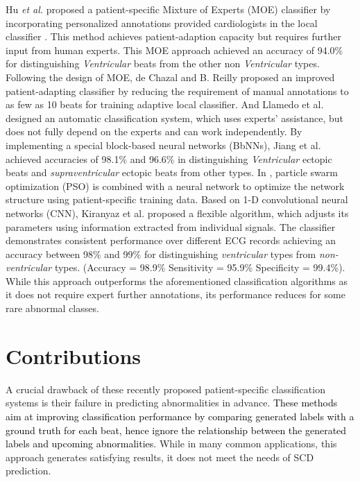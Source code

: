 Hu \textit{et al.} proposed a patient-specific Mixture of Experts (MOE) classifier by incorporating personalized annotations provided cardiologists in the local classifier \cite{Hu_et_al}. This method achieves patient-adaption capacity but requires further input from human experts. This MOE approach achieved an accuracy of 94.0\% for distinguishing \textit{Ventricular} beats from the other non \textit{Ventricular} types. Following the design of MOE, de Chazal and B. Reilly proposed an improved patient-adapting classifier by reducing the requirement of manual annotations to as few as 10 beats for training adaptive local classifier\cite{deChazal2006}. And Llamedo et al. designed an automatic classification system, which uses experts' assistance, but does not fully depend on the experts and can work independently\cite{llamedo2012automatic}. By implementing a special block-based neural networks (BbNNs), Jiang et al. achieved accuracies of 98.1\% and 96.6\% in distinguishing \textit{Ventricular} ectopic beats and \textit{supraventricular} ectopic beats from other types\cite{bbnn}. In \cite{ince2009generic}, particle swarm optimization (PSO) is combined with a neural network to optimize the network structure using patient-specific training data. Based on 1-D convolutional neural networks (CNN), Kiranyaz et al. proposed a flexible algorithm, which adjusts its parameters using information extracted from individual signals\cite{Kiranyaz}. The classifier demonstrates consistent performance over different ECG records achieving an accuracy between 98\% and 99\% for distinguishing \textit{ventricular} types from \textit{non-ventricular} types. (Accuracy = 98.9\%  Sensitivity = 95.9\% Specificity =  99.4\%). While this approach outperforms the aforementioned classification algorithms as it does not require expert further annotations, its performance reduces for some rare abnormal classes. 
 
\section{Contributions}

A crucial drawback of these recently proposed patient-specific classification systems is their failure in predicting abnormalities in advance. \textcolor{black}{These methods aim at improving classification performance by comparing generated labels with a ground truth for each beat, hence ignore the relationship between the generated labels and upcoming abnormalities. }%
While in many common applications, this approach generates satisfying results, it does not meet the needs of SCD prediction. %

